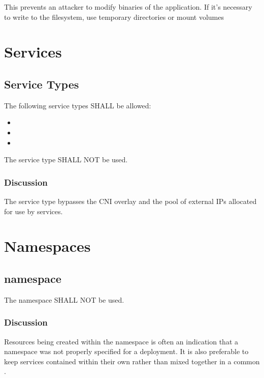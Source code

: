 \documentclass[PMO,authoryear,toc]{lsstdoc}
\begin{document}
This prevents an attacker to modify binaries of the application. If it's necessary to write to the filesystem, use temporary directories or mount volumes

\section{Services}\label{sec:svc}

\subsection{Service Types}

The following service types SHALL be allowed:

\begin{itemize}
  \item {}
  \item {}
  \item {}
\end{itemize}

The  service type SHALL NOT be used.

\subsubsection{Discussion}

The  service type bypasses the CNI overlay and the pool of external IPs allocated for use by  services.

\section{Namespaces}\label{sec:ns}

\subsection{ namespace}

The  namespace SHALL NOT be used.

\subsubsection{Discussion}

Resources being created within the  namespace is often an indication that a namespace was not properly specified for a deployment. It is also preferable to keep services contained within their own  rather than mixed together in a common .
\end{document}
